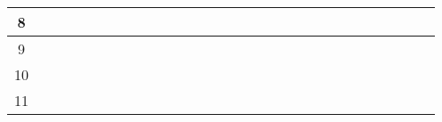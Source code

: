 \documentclass[a4paper,10pt]{article}
\begin{document}
\begin{table}
\begin{tabular}{|c|c|c|c|c|c|c|c|c|c|c|c|c|c|c|c|c|c|c|c|c|c|c|c|c|c|c|c|c|}
{\small 8} &  &  &  &  &  &  &  &  & \cellcolor{gray} &  &  &  & \cellcolor{gray} &  &  &  &  &  &  & \cellcolor{gray} &  &  & \cellcolor{gray} & \cellcolor{gray} &  &  &  &  \\ \hline
{\small 9} &  &  &  &  &  &  &  &  &  &  &  &  &  &  &  &  &  & \cellcolor{gray} &  &  &  & \cellcolor{gray} &  &  &  &  &  & \cellcolor{gray} \\ \hline
{\small 10} &  &  &  &  &  &  &  &  &  &  &  &  &  &  &  &  &  &  &  &  &  &  &  &  &  &  &  &  \\ \hline
{\small 11} &  &  &  &  &  &  &  &  &  &  &  &  &  &  &  &  &  &  &  &  &  &  &  &  &  &  &  & \cellcolor{gray} \\ \hline
\end{tabular}\end{table}
\FloatBarrier
{}

\end{document}
